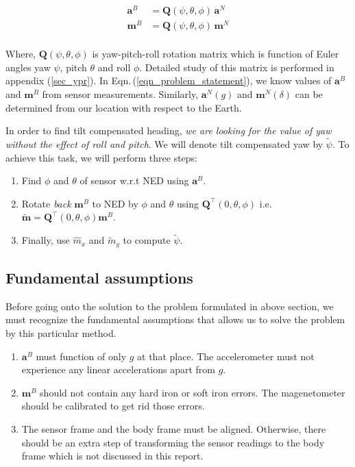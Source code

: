 \documentclass[12pt, a4paper]{article}
\begin{document}
\begin{equation}
\begin{split}
\bm{a}^{B} &= \bm{Q}(\psi,\theta,\phi)\,\bm{a}^{N} \\
\bm{m}^{B} &= \bm{Q}(\psi,\theta,\phi)\,\bm{m}^{N} \\
\end{split}
\label{eqn_problem_statement}
\end{equation}

Where, $\bm{Q}(\psi,\theta,\phi)$ is yaw-pitch-roll rotation matrix which is function of Euler angles yaw $\psi$, pitch $\theta$ and roll $\phi$. Detailed study of this matrix is performed in appendix (\ref{sec_ypr}). In Eqn.\,(\ref{eqn_problem_statement}), we know values of $\bm{a}^{B}$ and $\bm{m}^{B}$ from sensor measurements. Similarly, $\bm{a}^{N}(g)$ and $\bm{m}^{N}(\delta)$ can be determined from our location with respect to the Earth. \medskip

In order to find tilt compensated heading, \textit{we are looking for the value of yaw without the effect of roll and pitch}. We will denote tilt compensated yaw by $\tilde{\psi}$. To achieve this task, we will perform three steps: \medskip

\begin{enumerate}[nolistsep]
\item Find $\phi$ and $\theta$ of sensor w.r.t NED using $\bm{a}^{B}$.
\item Rotate \textit{back} $\bm{m}^{B}$ to NED by $\phi$ and $\theta$ using $\bm{Q}^{\intercal}(0,\theta,\phi)$ i.e. $\tilde{\bm{m}} = \bm{Q}^{\intercal}(0,\theta,\phi)\bm{m}^{B}$.
\item Finally, use $\hat{m}_{x}$ and $\tilde{m}_{y}$ to compute $\tilde{\psi}$.
\end{enumerate}

\subsection{Fundamental assumptions}
Before going onto the solution to the problem formulated in above section, we must recognize the fundamental assumptions that allows us to solve the problem by this particular method.

\begin{enumerate}
\item $\bm{a}^{B}$ must function of only $g$ at that place. The accelerometer must not experience any linear accelerations apart from $g$.
\item $\bm{m}^{B}$ should not contain any hard iron or soft iron errors. The magenetometer should be calibrated to get rid those errors.
\item The sensor frame and the body frame must be aligned. Otherwise, there should be an extra step of transforming the sensor readings to the body frame which is not discussed in this report.
\end{enumerate}
\end{document}
